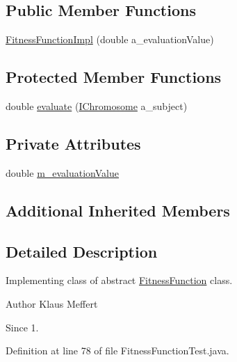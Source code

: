 \subsection*{Public Member Functions}
\begin{DoxyCompactItemize}
\item 
\hyperlink{classorg_1_1jgap_1_1_fitness_function_test_1_1_fitness_function_impl_af03d529efeedeea419bfdb6ebc6b99b1}{Fitness\-Function\-Impl} (double a\-\_\-evaluation\-Value)
\end{DoxyCompactItemize}
\subsection*{Protected Member Functions}
\begin{DoxyCompactItemize}
\item 
double \hyperlink{classorg_1_1jgap_1_1_fitness_function_test_1_1_fitness_function_impl_a03ea7e09f08e84fbdf1b40ad53242516}{evaluate} (\hyperlink{interfaceorg_1_1jgap_1_1_i_chromosome}{I\-Chromosome} a\-\_\-subject)
\end{DoxyCompactItemize}
\subsection*{Private Attributes}
\begin{DoxyCompactItemize}
\item 
double \hyperlink{classorg_1_1jgap_1_1_fitness_function_test_1_1_fitness_function_impl_a4d6f85bdff6993727519b1de36aa49cb}{m\-\_\-evaluation\-Value}
\end{DoxyCompactItemize}
\subsection*{Additional Inherited Members}


\subsection{Detailed Description}
Implementing class of abstract \hyperlink{classorg_1_1jgap_1_1_fitness_function}{Fitness\-Function} class.

\begin{DoxyAuthor}{Author}
Klaus Meffert 
\end{DoxyAuthor}
\begin{DoxySince}{Since}
1. 
\end{DoxySince}


Definition at line 78 of file Fitness\-Function\-Test.\-java.



